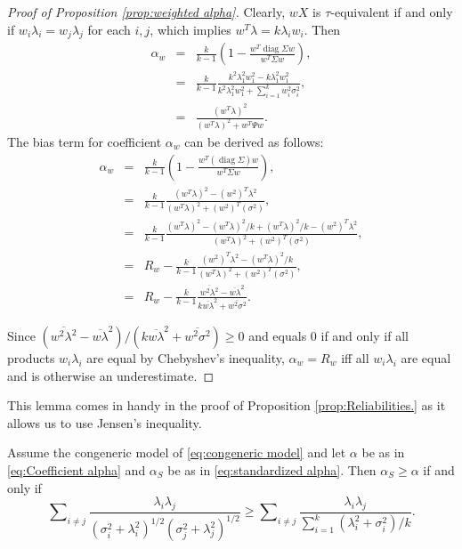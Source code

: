 \documentclass[twoside]{article}
\DeclareMathOperator{\diag}{diag}
\DeclareMathOperator{\tsum}{\textstyle \sum}
\renewcommand{\sqrt}[1]{{(#1)^{1/2}}}
\begin{document}
\begin{proof}[Proof of Proposition \ref{prop:weighted alpha}]
\label{proof:weighted alpha}Clearly, $wX$ is $\tau$-equivalent
if and only if $w_{i}\lambda_{i}=w_{j}\lambda_{j}$ for each $i,j$,
which implies $w^{T}\lambda=k\lambda_{i}w_{i}$. Then
\begin{eqnarray*}
\alpha_{w} & = & \frac{k}{k-1}\left(1-\frac{w^{T}\diag\Sigma w}{w^{T}\Sigma w}\right),\\
 & = & \frac{k}{k-1}\frac{k^{2}\lambda_{1}^{2}w_{1}^{2}-k\lambda_{1}^{2}w_{1}^{2}}{k^{2}\lambda_{1}^{2}w_{1}^{2}+\tsum_{i=1}^{k}w_{i}^{2}\sigma_{i}^{2}},\\
 & = & \frac{(w^{T}\lambda)^{2}}{(w^{T}\lambda)^{2}+w^{T}\Psi w}.
\end{eqnarray*}
The bias term for coefficient $\alpha_w$ can be derived as follows:
\begin{eqnarray*}
\alpha_{w} & = & \frac{k}{k-1}(1-\frac{w^{T}(\diag\Sigma)w}{w^{T}\Sigma w}),\\
 & = & \frac{k}{k-1}\frac{(w^{T}\lambda)^{2}-(w^{2})^{T}\lambda^{2}}{(w^{T}\lambda)^{2}+(w^{2})^{T}(\sigma^{2})},\\
 & = & \frac{k}{k-1}\frac{(w^{T}\lambda)^{2}-(w^{T}\lambda)^{2}/k+(w^{T}\lambda)^{2}/k-(w^{2})^{T}\lambda^{2}}{(w^{T}\lambda)^{2}+(w^{2})^{T}(\sigma^{2})},\\
 & = &  R_{w}-\frac{k}{k-1}\frac{(w^{2})^{T}\lambda^{2}-(w^{T}\lambda)^{2}/k}{(w^{T}\lambda)^{2}+(w^{2})^{T}(\sigma^{2})},\\
 & = &  R_{w}-\frac{k}{k-1}\frac{\overline{w^{2}\lambda^{2}}-\overline{w\lambda}^{2}}{k\overline{w\lambda}^{2}+\overline{w^{2}\sigma^{2}}}.
\end{eqnarray*}

Since $(\overline{w^{2}\lambda^{2}}-\overline{w\lambda}^{2})/(k\overline{w\lambda}^{2}+\overline{w^{2}\sigma^{2}})\geq0$
and equals $0$ if and only if all products $w_i\lambda_i$ are equal by Chebyshev's inequality, $\alpha_w= R_w$
iff all $w_i\lambda_i$ are equal and is otherwise an underestimate. 
\end{proof}

This lemma comes in handy in the proof of Proposition \ref{prop:Reliabilities.} as it allows us to use Jensen's inequality.

\begin{lem}
\label{lem:alpha_s}
Assume the congeneric model of \eqref{eq:congeneric model} and let $\alpha$ be as in \eqref{eq:Coefficient alpha} and $\alpha_S$ be as in \eqref{eq:standardized alpha}. Then $\alpha_S\geq\alpha$
if and only if
\begin{equation}
\label{eq:Alpha-alpha_s inequality}
\tsum_{i\neq j}\frac{\lambda_{i}\lambda_{j}}{\sqrt{\sigma_{i}^{2}+\lambda_{i}^{2}}\sqrt{\sigma_j^{2}+\lambda_{j}^{2}}} 
\geq
\tsum_{i\neq j}\frac{\lambda_{i}\lambda_{j}}{\tsum_{i=1}^{k}(\lambda_{i}^{2}+\sigma_{i}^{2})/k}.
\end{equation}
\end{lem}
\end{document}
